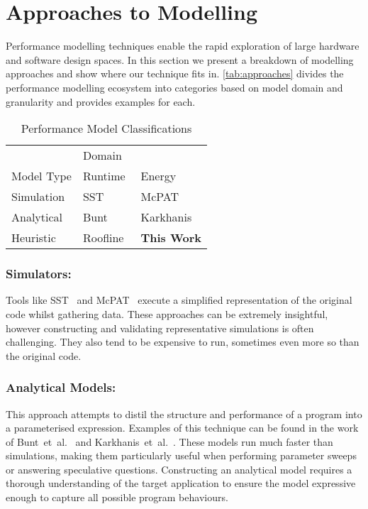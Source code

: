 \section{Approaches to Modelling}
\label{sec:approaches}
Performance modelling techniques enable the rapid exploration of large hardware and software design spaces.
In this section we present a breakdown of modelling approaches and show where our technique fits in.
\autoref{tab:approaches} divides the performance modelling ecosystem into categories based on model domain and granularity and provides examples for each.

\begin{table}
  \centering
  \caption{Performance Model Classifications}
  \setlength{\tabcolsep}{10pt}
  \begin{tabular}{lll}
  \toprule
    & \multicolumn{2}{l}{Domain}\\ \cmidrule(){2-3}
  Model Type  & Runtime & Energy \\
    \midrule
  Simulation & SST~\cite{rodrigues:2011aa} & McPAT~\cite{li:2009aa}  \\
  Analytical & Bunt~\cite{bunt:2013aa} & Karkhanis~\cite{karkhanis:2007aa} \\
  Heuristic & Roofline~\cite{williams:2009aa} & \textbf{This Work} \\
  \bottomrule
  \end{tabular}
  \label{tab:approaches}
\end{table}

\subsubsection{Simulators:} 
Tools like SST~\cite{rodrigues:2011aa} and McPAT~\cite{li:2009aa} execute a simplified representation of the original code whilst gathering data.
These approaches can be extremely insightful, however constructing and validating representative simulations is often challenging.
They also tend to be expensive to run, sometimes even more so than the original code.

\subsubsection{Analytical Models:} This approach attempts to distil the structure and performance of a program into a parameterised expression.
Examples of this technique can be found in the work of Bunt~et~al.~\cite{bunt:2013aa} and Karkhanis~et~al.~\cite{karkhanis:2007aa}.
These models run much faster than simulations, making them particularly useful when performing parameter sweeps or answering speculative questions.
Constructing an analytical model requires a thorough understanding of the target application to ensure the model expressive enough to capture all possible program behaviours.

